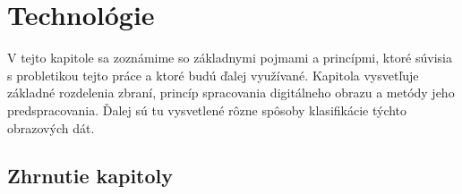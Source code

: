 \chapter{Technológie}
\label{chap:technologie}

V tejto kapitole sa zoznámime so základnymi pojmami a princípmi, ktoré súvisia s probletikou tejto práce a ktoré budú ďalej využívané.
Kapitola vysvetľuje základné rozdelenia zbraní, princíp spracovania digitálneho obrazu a metódy jeho predspracovania.
Ďalej sú tu vysvetlené rôzne spôsoby klasifikácie týchto obrazových dát.











\section{Zhrnutie kapitoly}

